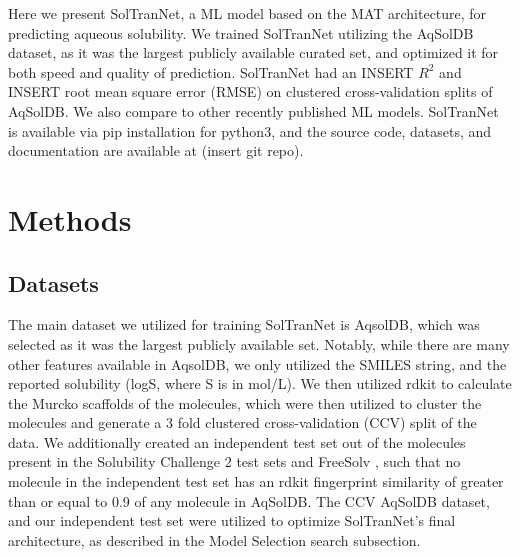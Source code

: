 \documentclass[journal=jmcmar,manuscript=article]{achemso}
\begin{document}
Here we present SolTranNet, a ML model based on the MAT architecture, for predicting aqueous solubility.
We trained SolTranNet utilizing the AqSolDB dataset\cite{AqSol}, as it was the largest publicly available curated set, and optimized it for both speed and quality of prediction.
SolTranNet had an INSERT $R^2$ and INSERT root mean square error (RMSE) on clustered cross-validation splits of AqSolDB.
We also compare to other recently published ML models.\cite{lovric,cui,boobier,llinas}
SolTranNet is available via pip installation for python3, and the source code, datasets, and documentation are available at (insert git repo).


\section{Methods}

\subsection{Datasets}
The main dataset we utilized for training SolTranNet is AqsolDB\cite{AqSol}, which was selected as it was the largest publicly available set.
Notably, while there are many other features available in AqsolDB, we only utilized the SMILES string, and the reported solubility (logS, where S is in mol/L).
We then utilized rdkit\cite{rdkit} to calculate the Murcko scaffolds of the molecules, which were then utilized to cluster the molecules and generate a 3 fold clustered cross-validation (CCV) split of the data.
We additionally created an independent test set out of the molecules present in the Solubility Challenge 2 test sets \cite{llinas} and FreeSolv \cite{freesolv}, such that no molecule in the independent test set has an rdkit fingerprint similarity of greater than or equal to 0.9 of any molecule in AqSolDB.
The CCV AqSolDB dataset, and our independent test set were utilized to optimize SolTranNet's final architecture, as described in the Model Selection search subsection.
\end{document}
